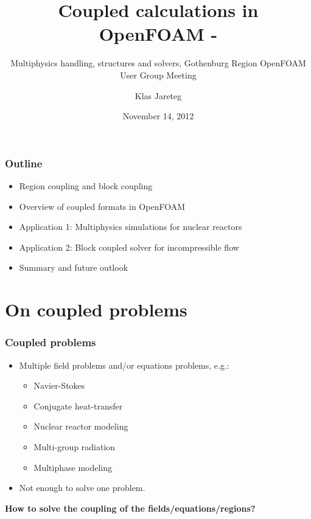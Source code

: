 \documentclass[9pt,handout]{beamer} %
\title{Coupled calculations in OpenFOAM - }
\subtitle{Multiphysics handling, structures and solvers, Gothenburg Region OpenFOAM User Group Meeting } %
\author[Klas Jareteg]{Klas Jareteg} %
\institute{Chalmers University of Technology}
\date{November 14, 2012}
\begin{document}

\begin{frame}[plain]
 \titlepage
\end{frame}

\begin{frame}
\frametitle{Outline}
\begin{itemize}\itemsep10pt
\item Region coupling and block coupling
\item Overview of coupled formats in OpenFOAM
\item Application 1: Multiphysics simulations for nuclear reactors
\item Application 2: Block coupled solver for incompressible flow
\item Summary and future outlook 
\end{itemize}
\end{frame}


\section{On coupled problems}
\begin{frame}%
\frametitle{Coupled problems}
\begin{itemize}
    \item Multiple field problems and/or equations problems, e.g.:
    \begin{itemize}\itemsep6pt
        \item Navier-Stokes
        \item Conjugate heat-transfer
        \item Nuclear reactor modeling
        \item Multi-group radiation
        \item Multiphase modeling
    \end{itemize}
    \pause
    \item Not enough to solve one problem. 
\end{itemize}
\vfill
\pause
\bf How to solve the coupling of the fields/equations/regions?
\end{frame}
\end{document}
